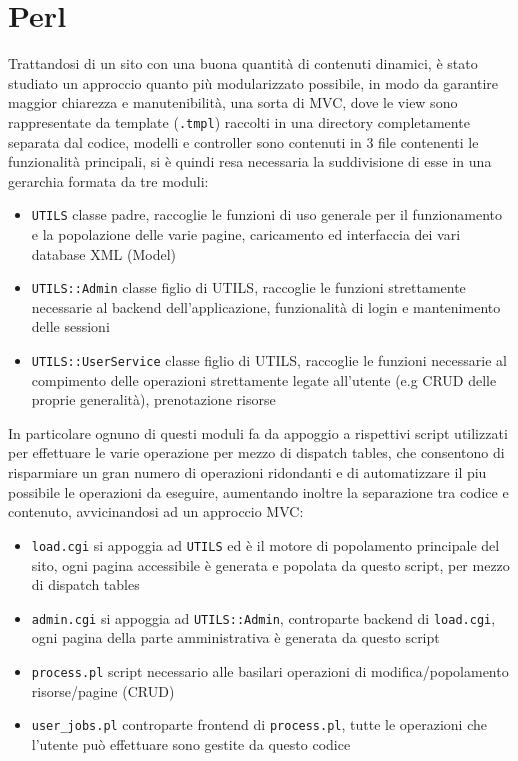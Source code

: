 \section{Perl}

Trattandosi di un sito con una buona quantità di contenuti dinamici, è stato studiato un approccio quanto più modularizzato possibile, in modo da garantire maggior chiarezza e manutenibilità, una sorta di MVC, dove le view sono rappresentate da template (\texttt{.tmpl}) raccolti in una directory completamente separata dal codice, modelli e controller sono contenuti in 3 file contenenti le funzionalità principali, si è quindi resa necessaria la suddivisione di esse in una gerarchia formata da tre moduli:

\begin{itemize}

  \item \texttt{UTILS} classe padre, raccoglie le funzioni di uso generale per il funzionamento e la popolazione delle varie pagine, caricamento ed interfaccia dei vari database XML (Model)
  \item \texttt{UTILS::Admin} classe figlio di UTILS, raccoglie le funzioni strettamente necessarie al backend dell'applicazione, funzionalità di login e mantenimento delle sessioni
  \item \texttt{UTILS::UserService} classe figlio di UTILS, raccoglie le funzioni necessarie al compimento delle operazioni strettamente legate all'utente (e.g CRUD delle proprie generalità), prenotazione risorse

\end{itemize}

In particolare ognuno di questi moduli fa da appoggio a rispettivi script utilizzati per effettuare le varie operazione per mezzo di dispatch tables, che consentono di risparmiare un gran numero di operazioni ridondanti e di automatizzare il piu possibile le operazioni da eseguire, aumentando inoltre la separazione tra codice e contenuto, avvicinandosi ad un approccio MVC:

\begin{itemize}

  \item \texttt{load.cgi} si appoggia ad \texttt{UTILS} ed è il motore di popolamento principale del sito, ogni pagina accessibile è generata e popolata da questo script, per mezzo di dispatch tables
  \item \texttt{admin.cgi} si appoggia ad \texttt{UTILS::Admin}, controparte backend di \texttt{load.cgi}, ogni pagina della parte amministrativa è generata da questo script
  \item \texttt{process.pl} script necessario alle basilari operazioni di modifica/popolamento risorse/pagine (CRUD)
  \item \texttt{user\_jobs.pl} controparte frontend di \texttt{process.pl}, tutte le operazioni che l'utente può effettuare sono gestite da questo codice

\end{itemize}
